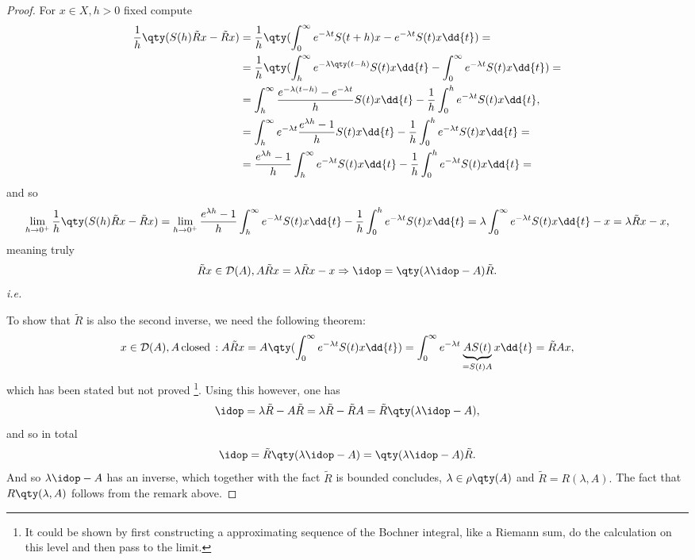 \begin{proof}
    For $x \in X, h >0$ fixed compute
    \begin{align*}
	    \frac{1}{h}\qty(S(h)\tilde{R}x - \tilde{R}x) &= \frac{1}{h}\qty(\int_0^{\infty}e^{-\lambda t}S(t+h)x - e^{-\lambda t}S(t)x \dd{t})=\\
							 &= \frac{1}{h}\qty(\int_h^\infty e^{-\lambda\qty(t-h)}S(t) x \dd{t} - \int_0^{\infty} e^{-\lambda t}S(t) x \dd{t}) =\\
							 & = \int_h^{\infty} \frac{e^{-\lambda(t-h)}-e^{-\lambda t}}{h}S(t)x \dd{t} - \frac{1}{h}\int_0^h e^{-\lambda t}S(t) x\dd{t}, \\
							 & = \int_h^{\infty}e^{-\lambda t} \frac{e^{\lambda h}-1}{h}S(t)x \dd{t} - \frac{1}{h}\int_0^h e^{-\lambda t}S(t) x\dd{t} = \\
							 & = \frac{e^{\lambda h}-1}{h} \int_h^{\infty}e^{-\lambda t}S(t)x \dd{t} - \frac{1}{h}\int_0^h e^{-\lambda t}S(t) x\dd{t} = 
    \end{align*}
    and so 
    \[
	    \lim_{h \to 0^+} \frac{1}{h}\qty(S(h)\tilde{R}x - \tilde{R}x) = \lim_{h \to 0^+} \frac{e^{\lambda h}-1}{h}\int_h^{\infty} e^{-\lambda t}S(t)x \dd{t} - \frac{1}{h}\int_0^h e^{-\lambda t}S(t) x\dd{t} = \lambda \int_0^{\infty}e^{- \lambda t} S(t) x \dd{t} -x = \lambda \tilde{R}x -x,
    \]
    meaning truly
    \[
	    \tilde{R}x \in \mathcal{D}(A), A \tilde{R}x = \lambda \tilde{R} x -x \Rightarrow \idop = \qty(\lambda \idop - A)\tilde{R}.
    \]
    \textit{i.e.} 

        To show that $\tilde{R}$ is also the second inverse, we need the following theorem:
    \[
	    x \in \mathcal{D}(A), A \, \text{closed} \,: A \tilde{R}x = A\qty(\int_0^{\infty}e^{-\lambda t}S(t)x \dd{t}) = \int_0^{\infty}e^{- \lambda t}\underbrace{A S(t)}_{= S(t)A} x \dd{t} = \tilde{R}Ax,
    \]
    which has been stated but not proved \footnote{It could be shown by first constructing a approximating sequence of the Bochner integral, like a Riemann sum, do the calculation on this level and then pass to the limit.}. Using this however, one has
    \[
	    \idop = \lambda \tilde{R} - A \tilde{R} = \lambda \tilde{R} - \tilde{R}A = \tilde{R}\qty(\lambda \idop - A),
    \]
    and so in total 
    \[
	    \idop = \tilde{R}\qty(\lambda \idop - A) = \qty(\lambda \idop - A) \tilde{R}.
    \]
    And so $\lambda \idop - A$ has an inverse, which together with the fact $\tilde{R}$ is bounded concludes, $\lambda \in \rho\qty(A)$ and $\tilde{R} = R(\lambda,A).$ The fact that $R\qty(\lambda,A)$ follows from the remark above.
\end{proof}

